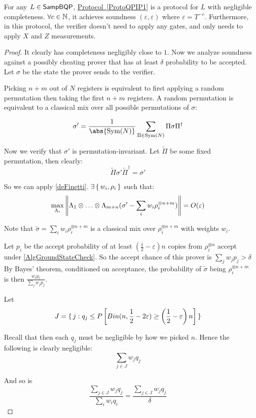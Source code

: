 \begin{thm}
    \label{QPIP1thm}
	For any $L\in\operatorname{\mathsf{SampBQP}}$, \hyperref[ProtoQPIP1]{Protocol~\ref*{ProtoQPIP1}} is a protocol for $L$ with negligible completeness. $\forall c\in\mathbb{N}$, it achieves soundness $(\varepsilon, \varepsilon)$ where $\varepsilon=T^{-c}$. Furthermore, in this protocol, the verifier doesn't need to apply any gates, and only needs to apply $X$ and $Z$ measurements.
\end{thm}
\begin{proof}
	It clearly has completeness negligibly close to $1$. Now we analyze soundness against a possibly cheating prover that has at least $\delta$ probability to be accepted. Let $\sigma$ be the state the prover sends to the verifier.

	Picking $n+m$ out of $N$ registers is equivalent to first applying a random permutation then taking the first $n+m$ registers.
	A random permutation is equivalent to a classical mix over all possible permutations of $\sigma$:

	$$\sigma'=\frac{1}{\abs{\Sym(N)}}\sum_{\Pi\in\Sym(N)}\Pi\sigma\Pi^\dagger$$

	Now we verify that $\sigma'$ is permutation-invariant.
	Let $\tilde{\Pi}$ be some fixed permutation, then clearly:
	$$\tilde{\Pi}\sigma'\tilde{\Pi}^\dagger=\sigma'$$

	So we can apply \autoref{deFinetti}. $\exists\set{w_i, \rho_i}$ such that:
	$$\max_{\Lambda_i}\left\lVert\Lambda_1\otimes\ldots\otimes\Lambda_{m+n}(\sigma'-\sum_i w_i\rho_i^{\otimes n+m})\right\rVert=O(\varepsilon)$$

	Note that $\tilde\sigma=\sum_i w_i\rho_i^{\otimes n+m}$ is a classical mix over $\rho_i^{\otimes n+m}$ with weights $w_i$.

	Let $p_i$ be the accept probability of at least $(\frac{1}{2}-\varepsilon)n$ copies from $\rho_i^{\otimes n}$ accept under \autoref{AlgGroundStateCheck}.
	So the accept chance of this prover is $\sum_j w_j p_j>\delta$
	By Bayes' theorem, conditioned on acceptance, the probability of $\tilde{\sigma}$ being $\rho_i^{\otimes n+m}$ is then $\frac{w_i p_i}{\sum_j w_j p_j}$.

	Let
	$$J=\set{j:q_j\leq P\left[Bin(n, \frac{1}{2}-2\varepsilon)\geq\left(\frac{1}{2}-\varepsilon\right)n\right]}$$

	Recall that then each $q_j$ must be negligible by how we picked $n$. Hence the following is clearly negligible:
	$$\sum_{j\in J} w_j q_j$$

	And so is
	$$\frac{\sum_{j\in J} w_j q_j}{\sum_i w_i q_i}=\frac{\sum_{j\in J} w_j q_j}{\delta}$$


\end{proof}
